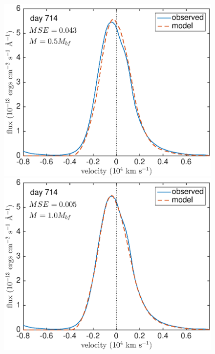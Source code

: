 \begin{figure}
\includegraphics[clip = true, scale=0.43, trim=20 20 40 0]{chapters/chapter5/images/MSE/d714_M/d714_M0_5}
\includegraphics[clip = true, scale=0.43, trim=52 20 40 0]{chapters/chapter5/images/MSE/d714_M/d714_M1}


\end{figure}
